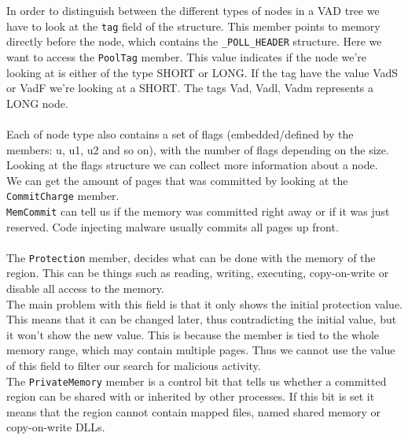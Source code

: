 \documentclass[a4paper]{article}
\begin{document}
%
In order to distinguish between the different types of nodes in a VAD tree we have to look at the \texttt{tag} field of the structure. This member points to memory directly before the node, which contains the \texttt{\_POLL\_HEADER} structure. Here we want to access the \texttt{PoolTag} member. This value indicates if the node we're looking at is either of the type SHORT or LONG. If the tag have the value VadS or VadF we're looking at a SHORT. The tags Vad, Vadl, Vadm represents a LONG node. \\ \\
Each of node type also contains a set of flags (embedded/defined by the members: u, u1, u2 and so on), with the number of flags depending on the size. Looking at the flags structure we can collect more information about a node. \\
We can get the amount of pages that was committed by looking at the \texttt{CommitCharge} member. \\
\texttt{MemCommit} can tell us if the memory was committed right away or if it was just reserved. Code injecting malware usually commits all pages up front. \\\\
The \texttt{Protection} member, decides what can be done with the memory of the region. This can be things such as reading, writing, executing, copy-on-write or disable all access to the memory. \\
The main problem with this field is that it only shows the initial protection value. This means that it can be changed later, thus contradicting the initial value, but it won't show the new value. This is because the member is tied to the whole memory range, which may contain multiple pages. Thus we cannot use the value of this field to filter our search for malicious activity. \\
The \texttt{PrivateMemory} member is a control bit that tells us whether a committed region can be shared with or inherited by other processes. If this bit is set it means that the region cannot contain mapped files, named shared memory or copy-on-write DLLs.
\end{document}
